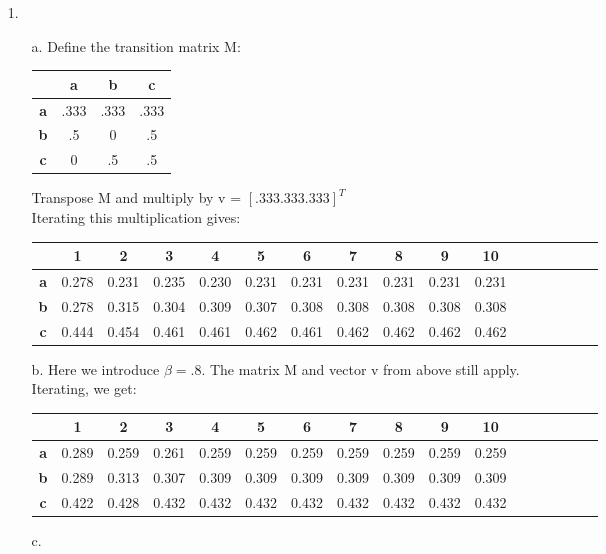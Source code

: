\documentclass{article}
\begin{document}
\begin{itemize}

\item[1.] 
	\begin{itemize}
		\item[a.] Define the transition matrix M:\\
		\begin{tabular}{c|c c c}
			 & \textbf{a} & \textbf{b} & \textbf{c} \\
			\hline
				\textbf{a} & .333 & .333 & .333\\
				\textbf{b} & .5 & 0 & .5\\
				\textbf{c} & 0 & .5 & .5\\
		\end{tabular}
		Transpose M and multiply by v = $[.333 .333. 333]^{T}$\\
		Iterating this multiplication gives:\\
		\begin{tabular}{c|c c c c c c c c c c c c c c c c}
			 & \textbf{1} & \textbf{2} & \textbf{3} & \textbf{4} & \textbf{5} & \textbf{6} & \textbf{7} & \textbf{8} & \textbf{9} & \textbf{10}\\
			\hline
				\textbf{a} &0.278&0.231&0.235&0.230&0.231&0.231&0.231&0.231&0.231&0.231\\
				\textbf{b} &0.278&0.315&0.304&0.309&0.307&0.308&0.308&0.308&0.308&0.308\\
				\textbf{c} &0.444&0.454&0.461&0.461&0.462&0.461&0.462&0.462&0.462&0.462\\
		\end{tabular}
		\item[b.] Here we introduce $\beta = .8$. The matrix M and vector v from above still apply.\\
		Iterating, we get:\\
		\begin{tabular}{c|c c c c c c c c c c c c c c c c}
			 & \textbf{1} & \textbf{2} & \textbf{3} & \textbf{4} & \textbf{5} & \textbf{6} & \textbf{7} & \textbf{8} & \textbf{9} & \textbf{10}\\
			\hline
				\textbf{a} &0.289&0.259&0.261&0.259&0.259&0.259&0.259&0.259&0.259&0.259\\
				\textbf{b} &0.289&0.313&0.307&0.309&0.309&0.309&0.309&0.309&0.309&0.309\\
				\textbf{c} &0.422&0.428&0.432&0.432&0.432&0.432&0.432&0.432&0.432&0.432\\
		\end{tabular}
		\item[c.]

\end{itemize}
\end{itemize}
\end{document}
